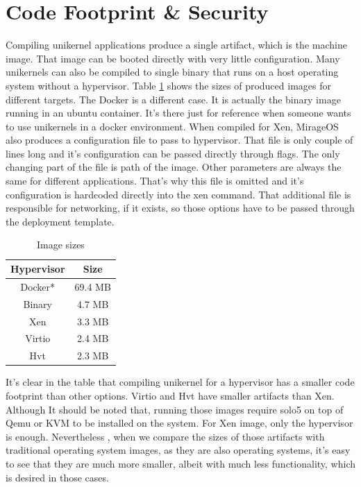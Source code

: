 \section{Code Footprint \& Security}
Compiling unikernel applications produce a single artifact, which is the machine image. That image can be booted directly with very little configuration. Many unikernels can also be compiled to single binary that runs on a host operating system without a hypervisor. Table \ref{tab:sizes} shows the sizes of produced images for different targets. The Docker is a different case. It is actually the binary image running in an ubuntu container. It's there just for reference when someone wants to use unikernels in a docker environment. When compiled for Xen, MirageOS also produces a configuration file to pass to hypervisor. That file is only couple of lines long and it's configuration can be passed directly through flags. The only changing part of the file is path of the image. Other parameters are always the same for different applications. That's why this file is omitted and it's configuration is hardcoded directly into the xen command. That additional file is responsible for networking, if it exists, so those options have to be passed through the deployment template.


\begin{table}[htpb]
  \caption[Image Sizes]{Image sizes}\label{tab:sizes}
  \centering
  \begin{tabular}{ |c|c| }
    \toprule
      Hypervisor & Size \\
    \midrule
    Docker* & 69.4 MB \\
     
      \hline
      Binary & 4.7 MB \\
    \hline
    Xen &  3.3 MB\\
    \hline
    Virtio & 2.4 MB \\
    \hline
      Hvt & 2.3 MB\\
    \bottomrule
  \end{tabular}
\end{table}


It's clear in the table that compiling unikernel for a hypervisor has a smaller code footprint than other options. Virtio and Hvt have smaller artifacts than Xen. Although It should be noted that, running those images require solo5 on top of Qemu or KVM to be installed on the system. For Xen image, only the hypervisor is enough. Nevertheless , when we compare the sizes of those artifacts with traditional operating system images, as they are also operating systems, it's easy to see that they are much more smaller, albeit with much less functionality, which is desired in those cases.

